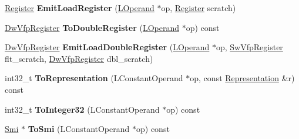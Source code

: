 \begin{DoxyCompactItemize}
\item 
\hyperlink{structv8_1_1internal_1_1_register}{Register} {\bfseries Emit\+Load\+Register} (\hyperlink{classv8_1_1internal_1_1_l_operand}{L\+Operand} $\ast$op, \hyperlink{structv8_1_1internal_1_1_register}{Register} scratch)\hypertarget{classv8_1_1internal_1_1_l_code_gen_aae04184e582568b386844732951cdda2}{}\label{classv8_1_1internal_1_1_l_code_gen_aae04184e582568b386844732951cdda2}

\item 
\hyperlink{structv8_1_1internal_1_1_double_register}{Dw\+Vfp\+Register} {\bfseries To\+Double\+Register} (\hyperlink{classv8_1_1internal_1_1_l_operand}{L\+Operand} $\ast$op) const \hypertarget{classv8_1_1internal_1_1_l_code_gen_aad85fae6ac6f5060e2d7b220ab87ede4}{}\label{classv8_1_1internal_1_1_l_code_gen_aad85fae6ac6f5060e2d7b220ab87ede4}

\item 
\hyperlink{structv8_1_1internal_1_1_double_register}{Dw\+Vfp\+Register} {\bfseries Emit\+Load\+Double\+Register} (\hyperlink{classv8_1_1internal_1_1_l_operand}{L\+Operand} $\ast$op, \hyperlink{structv8_1_1internal_1_1_sw_vfp_register}{Sw\+Vfp\+Register} flt\+\_\+scratch, \hyperlink{structv8_1_1internal_1_1_double_register}{Dw\+Vfp\+Register} dbl\+\_\+scratch)\hypertarget{classv8_1_1internal_1_1_l_code_gen_a271342eb2d8a6bf0f7e7b7e6224f2c42}{}\label{classv8_1_1internal_1_1_l_code_gen_a271342eb2d8a6bf0f7e7b7e6224f2c42}

\item 
int32\+\_\+t {\bfseries To\+Representation} (L\+Constant\+Operand $\ast$op, const \hyperlink{classv8_1_1internal_1_1_representation}{Representation} \&r) const \hypertarget{classv8_1_1internal_1_1_l_code_gen_a2a4cd68e415f9a85251295269fd6a125}{}\label{classv8_1_1internal_1_1_l_code_gen_a2a4cd68e415f9a85251295269fd6a125}

\item 
int32\+\_\+t {\bfseries To\+Integer32} (L\+Constant\+Operand $\ast$op) const \hypertarget{classv8_1_1internal_1_1_l_code_gen_a477ff533f07d93b0e1ca5f9290beea36}{}\label{classv8_1_1internal_1_1_l_code_gen_a477ff533f07d93b0e1ca5f9290beea36}

\item 
\hyperlink{classv8_1_1internal_1_1_smi}{Smi} $\ast$ {\bfseries To\+Smi} (L\+Constant\+Operand $\ast$op) const \hypertarget{classv8_1_1internal_1_1_l_code_gen_aea925647f08824b6bbbcc848e4d3745d}{}\label{classv8_1_1internal_1_1_l_code_gen_aea925647f08824b6bbbcc848e4d3745d}


\end{DoxyCompactItemize}
